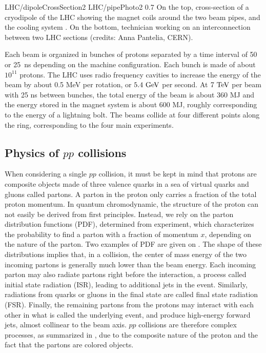                      {LHC/dipoleCrossSection2}
                     {LHC/pipePhoto2}
                     {0.7}
                     {On the top, cross-section of a cryodipole of the LHC
                     showing the magnet coils around the two beam pipes, and the cooling system \cite{LHC}.
                     On the bottom, technician working on an interconnection between two LHC
                     sections (credits: Anna Pantelia, CERN).}

    Each beam is organized in bunches of protons separated by a time interval of 50 or
    25~ns depending on the machine configuration. Each bunch is made of about $10^{11}$
    protons. The LHC uses radio frequency cavities to increase the energy of the beam by
    about 0.5 MeV per rotation, or $5.4~\text{GeV}$ per second. At $7~\text{TeV}$ per beam with 25 ns
    between bunches, the total energy of the beam is about 360 MJ and the energy stored
    in the magnet system is about 600 MJ, roughly corresponding to the energy of a
    lightning bolt. The beams collide at four different points along the
    ring, corresponding to the four main experiments.

        \subsection{Physics of $pp$ collisions \label{sec:physicsFromCollisionsAtTheLHC}}

    When considering a single $pp$ collision, it must be kept in mind that protons are
    composite objects made of three valence quarks in a sea of virtual quarks and gluons
    called partons. A parton in the proton only carries a fraction
    of the total proton momentum. In quantum chromodynamic, the
    structure of the proton can not easily be derived from first principles.
    Instead, we rely on the parton distribution functions (PDF), determined
    from experiment, which characterizes the probability to find a parton with a fraction of
    momentum $x$, depending on the nature of the parton. Two examples of PDF are given on
    . The shape of these
    distributions implies that, in a collision, the center of mass energy of the two incoming
    partons is generally much lower than the beam energy.  Each incoming parton may also
    radiate partons right before the interaction, a process called initial state radiation
    (ISR), leading to additional jets in the event. Similarly, radiations from quarks or
    gluons in the final state are called final state radiation (FSR). Finally, the remaining
    partons from the protons may interact with each other in what is called the underlying
    event, and produce high-energy forward jets, almost collinear to the beam axis. $pp$
    collisions are therefore complex processes, as summarized in ,
    due to the composite nature of the proton and the fact that the partons are colored
    objects.

